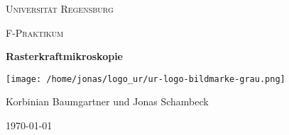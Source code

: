 \begin{titlepage}
	\centering
	{\scshape \LARGE Universität Regensburg \par}
	\vspace{1cm}
	{\scshape\Large F-Praktikum\par}
	\vspace{1.5cm}
	{\huge\bfseries Rasterkraftmikroskopie\par}
	\vspace{2cm}
	\texttt{[image: /home/jonas/logo\_ur/ur-logo-bildmarke-grau.png]}\par
	\vfill
	{\large Korbinian Baumgartner und Jonas Schambeck\par}

	\vfill

	{\large \today\par}
\end{titlepage}
